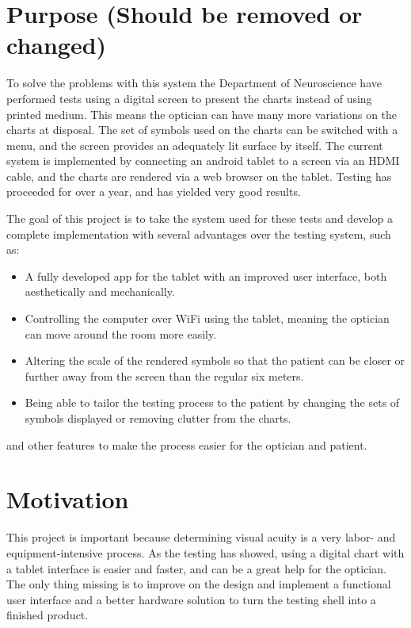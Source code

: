 \documentclass[12pt,a4paper,notitlepage]{report}
\begin{document}
\section{Purpose (Should be removed or changed)}
To solve the problems with this system the Department of Neuroscience have performed tests using a digital screen to present the charts instead of using printed medium. This means the optician can have many more variations on the charts at disposal. The set of symbols used on the charts can be switched with a menu, and the screen provides an adequately lit surface by itself. The current system is implemented by connecting an android tablet to a screen via an HDMI cable, and the charts are rendered via a web browser on the tablet. Testing has proceeded for over a year, and has yielded very good results.

The goal of this project is to take the system used for these tests and develop a complete implementation with several advantages over the testing system, such as:

\begin{itemize}
	\item A fully developed app for the tablet with an improved user interface, both aesthetically and mechanically.
	\item Controlling the computer over WiFi using the tablet, meaning the optician can move around the room more easily.
	\item Altering the scale of the rendered symbols so that the patient can be closer or further away from the screen than the regular six meters.
	\item Being able to tailor the testing process to the patient by changing the sets of symbols displayed or removing clutter from the charts.
\end{itemize}
	
and other features to make the process easier for the optician and patient.



\section{Motivation}
This project is important because determining visual acuity is a very labor- and equipment-intensive process. As the testing has showed, using a digital chart with a tablet interface is easier and faster, and can be a great help for the optician. The only thing missing is to improve on the design and implement a functional user interface and a better hardware solution to turn the testing shell into a finished product. 
\end{document}
